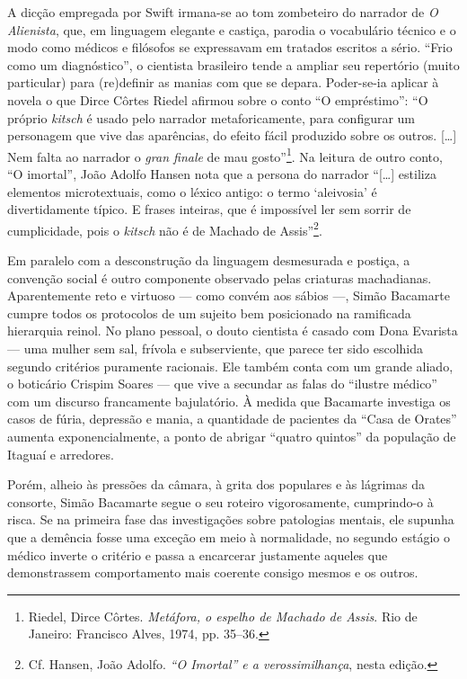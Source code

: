 A dicção empregada por Swift irmana-se ao tom zombeteiro do narrador de
\emph{O Alienista}, que, em linguagem elegante e castiça, parodia o
vocabulário técnico e o modo como médicos e filósofos se expressavam em
tratados escritos a sério. ``Frio como um diagnóstico'', o cientista
brasileiro tende a ampliar seu repertório (muito particular) para
(re)definir as manias com que se depara. Poder-se-ia aplicar à novela o
que Dirce Côrtes Riedel afirmou sobre o conto ``O empréstimo'': ``O
próprio \emph{kitsch} é usado pelo narrador metaforicamente, para
configurar um personagem que vive das aparências, do efeito fácil
produzido sobre os outros. {[}\ldots{}{]} Nem falta ao narrador o
\emph{gran finale} de mau gosto''\footnote{Riedel, Dirce Côrtes.
  \emph{Metáfora, o espelho de Machado de Assis}. Rio de Janeiro:
  Francisco Alves, 1974, pp. 35--36.}. Na leitura de outro conto, ``O
imortal'', João Adolfo Hansen nota que a persona do narrador
``{[}\ldots{}{]} estiliza elementos microtextuais, como o léxico antigo:
o termo `aleivosia' é divertidamente típico. E frases inteiras, que é
impossível ler sem sorrir de cumplicidade, pois o \emph{kitsch} não é de
Machado de Assis''\footnote{Cf. Hansen, João Adolfo. \emph{``O Imortal''
  e a verossimilhança}, nesta edição.}.

Em paralelo com a desconstrução da linguagem desmesurada e postiça, a
convenção social é outro componente observado pelas criaturas
machadianas. Aparentemente reto e virtuoso --- como convém aos sábios ---,
Simão Bacamarte cumpre todos os protocolos de um sujeito bem posicionado
na ramificada hierarquia reinol. No plano pessoal, o douto cientista é
casado com Dona Evarista --- uma mulher sem sal, frívola e subserviente,
que parece ter sido escolhida segundo critérios puramente racionais. Ele
também conta com um grande aliado, o boticário Crispim Soares --- que
vive a secundar as falas do ``ilustre médico'' com um discurso
francamente bajulatório. À medida que Bacamarte investiga os casos de
fúria, depressão e mania, a quantidade de pacientes da ``Casa de
Orates'' aumenta exponencialmente, a ponto de abrigar ``quatro quintos''
da população de Itaguaí e arredores.

Porém, alheio às pressões da câmara, à grita dos populares e às lágrimas
da consorte, Simão Bacamarte segue o seu roteiro vigorosamente,
cumprindo-o à risca. Se na primeira fase das investigações sobre
patologias mentais, ele supunha que a demência fosse uma exceção em meio
à normalidade, no segundo estágio o médico inverte o critério e passa a
encarcerar justamente aqueles que demonstrassem comportamento mais
coerente consigo mesmos e os outros.

